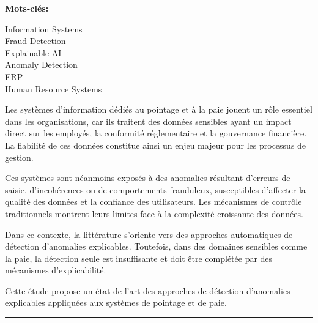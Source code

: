 \documentclass[10pt]{article}
\begin{document}
\color{black}

\begin{minipage}[t]{0.24\textwidth}
{\color{journalblue}
\textbf{Mots-clés:}

\vspace{0.3cm}

Information Systems\\
Fraud Detection\\
Explainable AI\\
Anomaly Detection\\
ERP\\
Human Resource Systems

\vspace{0.8cm}

}
\end{minipage}
\hfill
\begin{minipage}[t]{0.74\textwidth}
{\color{journalblue}
Les systèmes d’information dédiés au pointage et à la paie jouent un rôle essentiel dans les organisations, car ils traitent des données sensibles ayant un impact direct sur les employés, la conformité réglementaire et la gouvernance financière. La fiabilité de ces données constitue ainsi un enjeu majeur pour les processus de gestion.

Ces systèmes sont néanmoins exposés à des anomalies résultant d’erreurs de saisie, d’incohérences ou de comportements frauduleux, susceptibles d’affecter la qualité des données et la confiance des utilisateurs. Les mécanismes de contrôle traditionnels montrent leurs limites face à la complexité croissante des données.

Dans ce contexte, la littérature s’oriente vers des approches automatiques de détection d’anomalies explicables. Toutefois, dans des domaines sensibles comme la paie, la détection seule est insuffisante et doit être complétée par des mécanismes d’explicabilité.

Cette étude propose un état de l’art des approches de détection d’anomalies explicables appliquées aux systèmes de pointage et de paie.
}
\end{minipage}

\vspace{0.5cm}
{\color{journalblue}\hrule}

\end{document}
